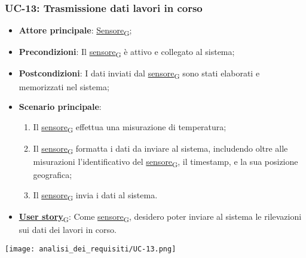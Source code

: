 \subsubsection{UC-13: Trasmissione dati lavori in corso}
\begin{itemize}
	\item \textbf{Attore principale}: \href{https://7last.github.io/docs/rtb/documentazione-interna/glossario\#sensore}{Sensore\textsubscript{G}};
	\item \textbf{Precondizioni}: Il \href{https://7last.github.io/docs/rtb/documentazione-interna/glossario\#sensore}{sensore\textsubscript{G}} è attivo e collegato al sistema;
	\item \textbf{Postcondizioni}: I dati inviati dal \href{https://7last.github.io/docs/rtb/documentazione-interna/glossario\#sensore}{sensore\textsubscript{G}} sono stati elaborati e memorizzati nel sistema;
	\item \textbf{Scenario principale}:
	      \begin{enumerate}
		      \item Il \href{https://7last.github.io/docs/rtb/documentazione-interna/glossario\#sensore}{sensore\textsubscript{G}} effettua una misurazione di temperatura;
		      \item Il \href{https://7last.github.io/docs/rtb/documentazione-interna/glossario\#sensore}{sensore\textsubscript{G}} formatta i dati da inviare al sistema, includendo oltre alle misurazioni l'identificativo del \href{https://7last.github.io/docs/rtb/documentazione-interna/glossario\#sensore}{sensore\textsubscript{G}},
		            il timestamp, e la sua posizione geografica;
		      \item Il \href{https://7last.github.io/docs/rtb/documentazione-interna/glossario\#sensore}{sensore\textsubscript{G}} invia i dati al sistema.
	      \end{enumerate}
	\item \href{https://7last.github.io/docs/rtb/documentazione-interna/glossario\#user-story}{\textbf{User story}\textsubscript{G}}: Come \href{https://7last.github.io/docs/rtb/documentazione-interna/glossario\#sensore}{sensore\textsubscript{G}}, desidero poter inviare al sistema le rilevazioni sui dati dei lavori in corso.
\end{itemize}

\begin{center}
	\texttt{[image: analisi\_dei\_requisiti/UC-13.png]}
\end{center}

